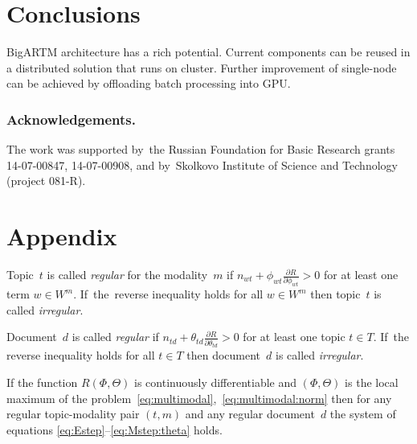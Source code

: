 \documentclass{llncs}
\begin{document}
\section{Conclusions}
\label{sec:Conclusions}

BigARTM architecture has a rich potential.
Current components can be reused in a distributed solution that runs on cluster.
Further improvement of single-node can be achieved by offloading batch processing into GPU.

\bigskip
\subsubsection*{Acknowledgements.}
    The work was supported by~the Russian Foundation for Basic Research grants 14-07-00847, 14-07-00908,
    and by~Skolkovo Institute of Science and Technology (project 081-R).


%



\section*{Appendix}

Topic~$t$ is called \emph{regular} for the modality~$m$
if ${n_{wt} + \phi_{wt} \frac{\partial R}{\partial \phi_{wt}} > 0}$
for at least one term ${w\in W^m}$.
If~the~reverse inequality holds for all ${w\in W^m}$ then
topic~$t$ is called \emph{irregular}.

Document~$d$ is called \emph{regular}
if ${n_{td} + \theta_{td} \frac{\partial R}{\partial \theta_{td}} > 0}$
for at least one topic ${t\in T}$.
If~the reverse inequality holds for all ${t\in T}$ then
document~$d$ is called \emph{irregular}.

\begin{theorem}
\label{th:multimodal}
    If the function $R(\Phi,\Theta)$ is continuously differentiable
    and $(\Phi,\Theta)$ is the local maximum
    of the problem~\eqref{eq:multimodal},~\eqref{eq:multimodal:norm}
    then for any regular topic-modality pair $(t,m)$ and any regular document~$d$
    the system of equations \eqref{eq:Estep}--\eqref{eq:Mstep:theta} holds.
\end{theorem}
\end{document}
